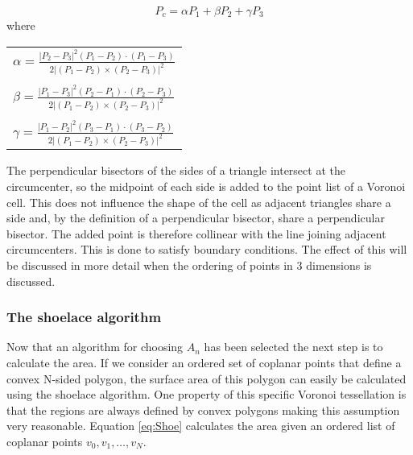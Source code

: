 \begin{equation}
    P_c = \alpha P_1 + \beta P_2 + \gamma P_3
    \label{eq:BaryCenter}
\end{equation}
where 
\begin{table}[h]
    \centering
    \begin{tabular}{l}
        $\alpha = \frac{|P_2 - P_3|^2(P_1-P_2)\cdot(P_1-P_3)}{2|(P_1-P_2)\times (P_2 - P_3)|^2}$\\
        \\
        $\beta  = \frac{|P_1 - P_3|^2(P_2-P_1)\cdot(P_2-P_3)}{2|(P_1-P_2)\times (P_2 - P_3)|^2}$\\
        \\
        $\gamma = \frac{|P_1 - P_2|^2(P_3-P_1)\cdot(P_3-P_2)}{2|(P_1-P_2)\times (P_2 - P_3)|^2}$\\
    \end{tabular}
\end{table}
The perpendicular bisectors of the sides of a triangle intersect at the circumcenter, so the midpoint of each side is added to the point list of a Voronoi cell. This does not influence the shape of the cell as adjacent triangles share a side and, by the definition of a perpendicular bisector, share a perpendicular bisector. The added point is therefore collinear with the line joining adjacent circumcenters. This is done to satisfy boundary conditions. The effect of this will be discussed in more detail when the ordering of points in 3 dimensions is discussed.
\subsubsection*{The shoelace algorithm}
Now that an algorithm for choosing $A_n$ has been selected the next step is to calculate the area. If we consider an ordered set of coplanar points that define a convex N-sided polygon, the surface area of this polygon can easily be calculated using the shoelace algorithm. One property of this specific Voronoi tessellation is that the regions are always defined by convex polygons making this assumption very reasonable. Equation \ref{eq:Shoe} calculates the area given an ordered list of coplanar points $v_0, v_1, \dots, v_{N}$.

